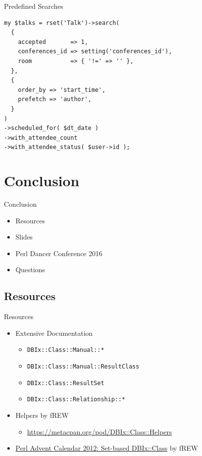 \begin{frame}[fragile]{Predefined Searches}
\begin{lstlisting}
my $talks = rset('Talk')->search(
  {
    accepted       => 1,
    conferences_id => setting('conferences_id'),
    room           => { '!=' => '' },
  },
  {
    order_by => 'start_time',
    prefetch => 'author',
  }
)
->scheduled_for( $dt_date )
->with_attendee_count
->with_attendee_status( $user->id );
\end{lstlisting}
\end{frame}

\section{Conclusion}

\begin{frame}{Conclusion}
\begin{itemize}
\item Resources
\item Slides
\item Perl Dancer Conference 2016
\item Questions
\end{itemize}
\end{frame}

\subsection{Resources}
\begin{frame}[fragile]{Resources}
\begin{itemize}
\item Extensive Documentation
\begin{itemize}
\item \verb|DBIx::Class::Manual::*|
\item \verb|DBIx::Class::Manual::ResultClass|
\item \verb|DBIx::Class::ResultSet|
\item \verb|DBIx::Class::Relationship::*|
\end{itemize}
\item Helpers by fREW
\begin{itemize}
\item \href{https://metacpan.org/pod/DBIx::Class::Helpers}{https://metacpan.org/pod/DBIx::Class::Helpers}
\end{itemize}
\item \href{http://www.perladvent.org/2012/2012-12-21.html}
{Perl Advent Calendar 2012: Set-based DBIx::Class}
by fREW
\end{itemize}
\end{frame}


